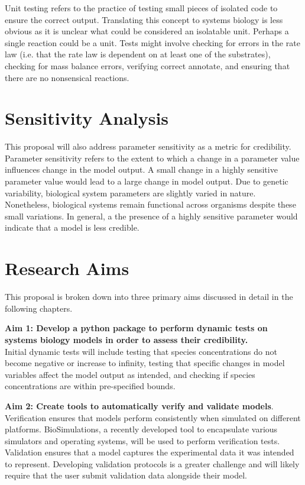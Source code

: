\documentclass[12pt]{report}
\begin{document}
Unit testing refers to the practice of testing small pieces of isolated code to ensure the correct output. Translating this concept to systems biology is less obvious as it is unclear what could be considered an isolatable unit. Perhaps a single reaction could be a unit. Tests might involve checking for errors in the rate law (i.e. that the rate law is dependent on at least one of the substrates), checking for mass balance errors, verifying correct annotate, and ensuring that there are no nonsensical reactions. 


\section{Sensitivity Analysis}
This proposal will also address parameter sensitivity as a metric for credibility. Parameter sensitivity refers to the extent to which a change in a parameter value influences change in the model output. A small change in a highly sensitive parameter value would lead to a large change in model output. Due to genetic variability, biological system parameters are slightly varied in nature. Nonetheless, biological systems remain functional across organisms despite these small variations. In general, a the presence of a highly sensitive parameter would indicate that a model is less credible.

\section{Research Aims}
This proposal is broken down into three primary aims discussed in detail in the following chapters. 

\textbf{Aim 1: Develop a python package to perform dynamic tests on systems biology models in order to assess their credibility.}\\
Initial dynamic tests will include testing that species concentrations do not become negative or increase to infinity, testing that specific changes in model variables affect the model output as intended, and checking if species concentrations are within pre-specified bounds.

\textbf{Aim 2: Create tools to automatically verify and validate models}. \\
Verification ensures that models perform consistently when simulated on different platforms. BioSimulations, a recently developed tool to encapsulate various simulators and operating systems, will be used to perform verification tests. Validation ensures that a model captures the experimental data it was intended to represent. Developing validation protocols is a greater challenge and will likely require that the user submit validation data alongside their model. 
\end{document}
